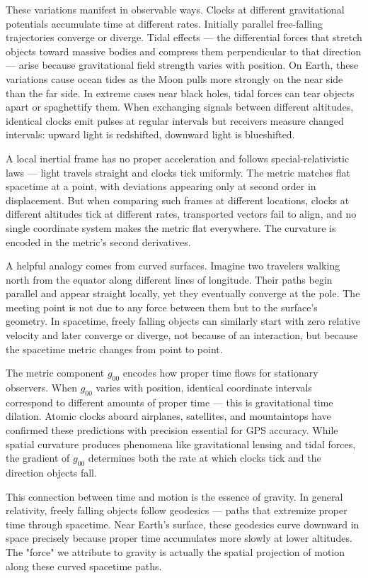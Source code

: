 These variations manifest in observable ways. Clocks at different gravitational potentials accumulate time at different rates. Initially parallel free-falling trajectories converge or diverge. Tidal effects — the differential forces that stretch objects toward massive bodies and compress them perpendicular to that direction — arise because gravitational field strength varies with position. On Earth, these variations cause ocean tides as the Moon pulls more strongly on the near side than the far side. In extreme cases near black holes, tidal forces can tear objects apart or spaghettify them. When exchanging signals between different altitudes, identical clocks emit pulses at regular intervals but receivers measure changed intervals: upward light is redshifted, downward light is blueshifted.

A local inertial frame has no proper acceleration and follows special-relativistic laws — light travels straight and clocks tick uniformly. The metric matches flat spacetime at a point, with deviations appearing only at second order in displacement. But when comparing such frames at different locations, clocks at different altitudes tick at different rates, transported vectors fail to align, and no single coordinate system makes the metric flat everywhere. The curvature is encoded in the metric's second derivatives.

A helpful analogy comes from curved surfaces. Imagine two travelers walking north from the equator along different lines of longitude. Their paths begin parallel and appear straight locally, yet they eventually converge at the pole. The meeting point is not due to any force between them but to the surface’s geometry. In spacetime, freely falling objects can similarly start with zero relative velocity and later converge or diverge, not because of an interaction, but because the spacetime metric changes from point to point.

The metric component \( g_{00} \) encodes how proper time flows for stationary observers. When \( g_{00} \) varies with position, identical coordinate intervals correspond to different amounts of proper time — this is gravitational time dilation. Atomic clocks aboard airplanes, satellites, and mountaintops have confirmed these predictions with precision essential for GPS accuracy. While spatial curvature produces phenomena like gravitational lensing and tidal forces, the gradient of \( g_{00} \) determines both the rate at which clocks tick and the direction objects fall.

This connection between time and motion is the essence of gravity. In general relativity, freely falling objects follow geodesics — paths that extremize proper time through spacetime. Near Earth's surface, these geodesics curve downward in space precisely because proper time accumulates more slowly at lower altitudes. The "force" we attribute to gravity is actually the spatial projection of motion along these curved spacetime paths.

